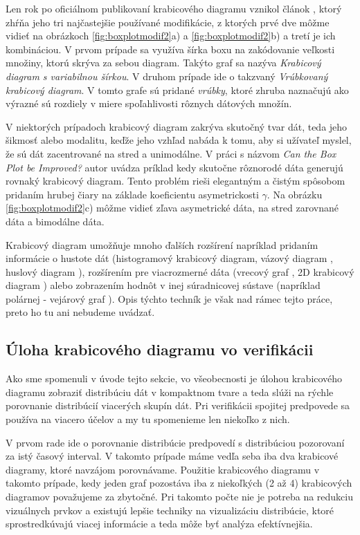 Len rok po oficiálnom publikovaní krabicového diagramu vznikol článok \cite{McGill}, ktorý zhŕňa jeho tri najčastejšie používané modifikácie, z ktorých prvé dve môžme vidieť na obrázkoch \ref{fig:boxplotmodif2}a) a \ref{fig:boxplotmodif2}b) a tretí je ich kombináciou. V prvom prípade sa využíva šírka boxu na zakódovanie veľkosti množiny, ktorú skrýva za sebou diagram. Takýto graf sa nazýva \textit{Krabicový diagram s variabilnou šírkou}.  
V druhom prípade ide o takzvaný \textit{Vrúbkovaný krabicový diagram}. V tomto grafe sú pridané \textit{vrúbky}, ktoré zhruba naznačujú ako výrazné sú rozdiely v miere spoľahlivosti rôznych dátových množín. 

V niektorých prípadoch krabicový diagram zakrýva skutočný tvar dát, teda jeho šikmosť alebo modalitu, keďže jeho vzhľad nabáda k tomu, aby si užívateľ myslel, že sú dát zacentrované na stred a unimodálne. V práci s názvom \textit{Can the Box Plot be Improved?} \cite{Chamnein} autor uvádza príklad kedy skutočne rôznorodé dáta generujú rovnaký krabicový diagram. Tento problém rieši elegantným a čistým spôsobom pridaním hrubej čiary na základe koeficientu asymetrickosti $ \gamma $. Na obrázku \ref{fig:boxplotmodif2}c) môžme vidieť zľava asymetrické dáta, na stred zarovnané dáta a bimodálne dáta.

Krabicový diagram umožňuje mnoho ďalších rozšírení napríklad pridaním informácie o hustote dát (histogramový krabicový diagram, vázový diagram \cite{HistVasePlot} , huslový diagram \cite{ViolinPlot}), rozšírením pre viacrozmerné dáta (vrecový graf \cite{Bagplot}, 2D krabicový diagram \cite{Boxplot2D} ) alebo zobrazením hodnôt v inej súradnicovej sústave (napríklad polárnej - vejárový graf \cite{FanChart}). Opis týchto techník je však nad rámec tejto práce, preto ho tu ani nebudeme uvádzať.

\subsection{Úloha krabicového diagramu vo verifikácii}

Ako sme spomenuli v úvode tejto sekcie, vo všeobecnosti je úlohou krabicového diagramu zobraziť distribúciu dát v kompaktnom tvare a teda slúži na rýchle porovnanie distribúcií viacerých skupín dát.
Pri verifikácii spojitej predpovede sa používa na viacero účelov a my tu spomenieme len niekoľko z nich. 

V prvom rade ide o porovnanie distribúcie predpovedí s distribúciou pozorovaní za istý časový interval. V takomto prípade máme vedľa seba iba dva krabicové diagramy, ktoré navzájom porovnávame. Použitie krabicového diagramu v takomto prípade, kedy jeden graf pozostáva iba z niekoľkých (2 až 4) krabicových diagramov považujeme za zbytočné. Pri takomto počte nie je potreba na redukciu vizuálnych prvkov a existujú lepšie techniky na vizualizáciu distribúcie, ktoré sprostredkúvajú viacej informácie a teda môže byť analýza efektívnejšia. 

